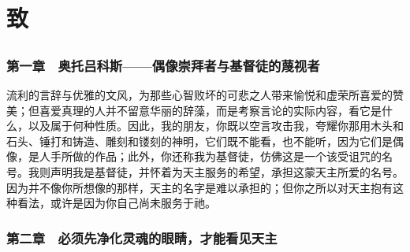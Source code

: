 
\chapter{致}


\newline{}\newline{}\par



\section{}


\subsection{第一章　奥托吕科斯——偶像崇拜者与基督徒的蔑视者}

流利的言辞与优雅的文风，为那些心智败坏的可悲之人带来愉悦和虚荣所喜爱的赞美；但喜爱真理的人并不留意华丽的辞藻，而是考察言论的实际内容，看它是什么，以及属于何种性质。因此，我的朋友，你既以空言攻击我，夸耀你那用木头和石头、锤打和铸造、雕刻和镂刻的神明，它们既不能看，也不能听，因为它们是偶像，是人手所做的作品；此外，你还称我为基督徒，仿佛这是一个该受诅咒的名号。我则声明我是基督徒，并怀着为天主服务的希望，承担这蒙天主所爱的名号。因为并不像你所想像的那样，天主的名字是难以承担的；但你之所以对天主抱有这种看法，或许是因为你自己尚未服务于祂。\par


\subsection{第二章　必须先净化灵魂的眼睛，才能看见天主}


